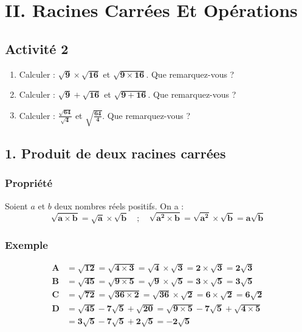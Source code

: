 \documentclass[12pt,a4paper]{article}
\begin{document}
\section*{\color{myred}II. Racines Carrées Et Opérations}

\subsection*{\color{myred} Activité 2 }
\begin{enumerate}[label=\textbf{\arabic*.}]
    \item Calculer : $\mathbf{\sqrt{9} \times \sqrt{16}}$ \quad et \quad $\mathbf{\sqrt{9 \times 16}}$. Que remarquez-vous ?
    
    \vspace{0.2cm}
    \item Calculer : $\mathbf{\sqrt{9} + \sqrt{16}}$ \quad et \quad $\mathbf{\sqrt{9 + 16}}$. Que remarquez-vous ?
    
    \vspace{0.2cm}
    \item Calculer : $\mathbf{\frac{\sqrt{64}}{\sqrt{4}}}$ \quad et \quad $\mathbf{\sqrt{\frac{64}{4}}}$. Que remarquez-vous ?
\end{enumerate}
\subsection*{\color{myred} 1. Produit de deux racines carrées }

\subsubsection*{\color{myred} Propriété }
Soient $a$ et $b$ deux nombres réels positifs. On a :
\[
\mathbf{\sqrt{a \times b} = \sqrt{a} \times \sqrt{b} \quad ; \quad \sqrt{a^2 \times b} = \sqrt{a^2} \times \sqrt{b} = a\sqrt{b}}
\]
\subsubsection*{\color{myred} Exemple }
\begin{align*}
\mathbf{A} &\mathbf{{}= \sqrt{12} = \sqrt{4 \times 3} = \sqrt{4} \times \sqrt{3} = 2 \times \sqrt{3} = 2\sqrt{3}} \\[0.2cm]
\mathbf{B} &\mathbf{{}= \sqrt{45} = \sqrt{9 \times 5} = \sqrt{9} \times \sqrt{5} = 3 \times \sqrt{5} = 3\sqrt{5}} \\[0.2cm]
\mathbf{C} &\mathbf{{}= \sqrt{72} = \sqrt{36 \times 2} = \sqrt{36} \times \sqrt{2} = 6 \times \sqrt{2} = 6\sqrt{2}} \\[0.2cm]
\mathbf{D} &\mathbf{{}= \sqrt{45} - 7\sqrt{5} + \sqrt{20} = \sqrt{9 \times 5} - 7\sqrt{5} + \sqrt{4 \times 5}} \\[0.1cm]
&\mathbf{{}= 3\sqrt{5} - 7\sqrt{5} + 2\sqrt{5} = -2\sqrt{5}}
\end{align*}
\end{document}
